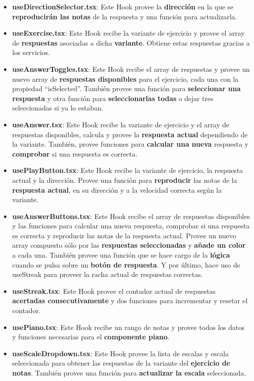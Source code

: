 \documentclass[12pt,twoside,titlepage]{report}
\begin{document}
\begin{itemize}
    \item \textbf{useDirectionSelector.tsx}: Este Hook provee la \textbf{dirección} en la que se \textbf{reproducirán las notas} de la respuesta y una función para actualizarla.
    \item \textbf{useExercise.tsx}: Este Hook recibe la variante de ejercicio y provee el array de \textbf{respuestas} asociadas a dicha \textbf{variante}. Obtiene estas respuestas gracias a los servicios.
    \item \textbf{useAnswerToggles.tsx}: Este Hook recibe el array de respuestas y provee un nuevo array de \textbf{respuestas disponibles} para el ejercicio, cada una con la propiedad ``isSelected''. También provee una función para \textbf{seleccionar una respuesta} y otra función para \textbf{seleccionarlas todas} o dejar tres seleccionadas si ya lo estaban.
    \item \textbf{useAnswer.tsx}: Este Hook recibe la variante de ejercicio y el array de respuestas disponibles, calcula y provee la \textbf{respuesta actual} dependiendo de la variante. También, provee funciones para \textbf{calcular una nueva} respuesta y \textbf{comprobar} si una respuesta es correcta.
    \item \textbf{usePlayButton.tsx}: Este Hook recibe la variante de ejercicio, la respuesta actual y la dirección. Provee una función para \textbf{reproducir} las notas de la \textbf{respuesta actual}, en su dirección y a la velocidad correcta según la variante.
    \item \textbf{useAnswerButtons.tsx}:  Este Hook recibe el array de respuestas disponibles y las funciones para calcular una nueva respuesta, comprobar si una respuesta es correcta y reproducir las notas de la respuesta actual. Provee un nuevo array compuesto sólo por las \textbf{respuestas seleccionadas} y \textbf{añade un color} a cada una. También provee una función que se hace cargo de la \textbf{lógica} cuando se pulsa sobre un \textbf{botón de respuesta}. Y por último, hace uso de useStreak para proveer la racha actual de respuestas correctas.
    \item \textbf{useStreak.tsx}: Este Hook provee el contador actual de respuestas \textbf{acertadas consecutivamente} y dos funciones para incrementar y resetar el contador.
    \item \textbf{usePiano.tsx}: Este Hook recibe un rango de notas y provee todos los datos y funciones necesarias para el \textbf{componente piano}.
    \item \textbf{useScaleDropdown.tsx}: Este Hook provee la lista de escalas y escala seleccionada para obtener las respuestas de la variante del \textbf{ejercicio de notas}. También provee una función para \textbf{actualizar la escala} seleccionada.
\end{itemize}
\end{document}
